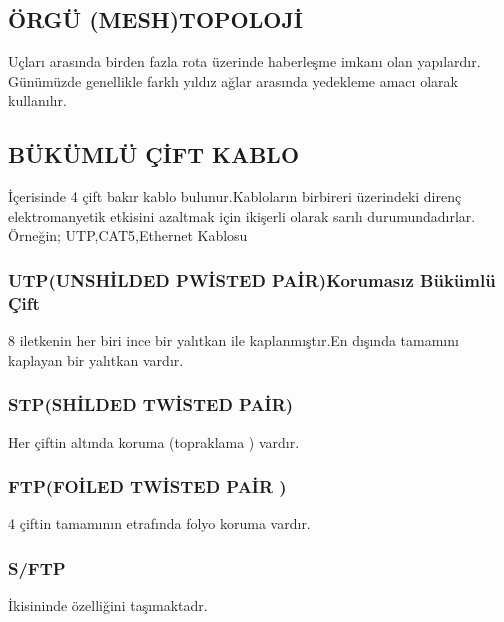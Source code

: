 \subsection*{ÖRGÜ (MESH)TOPOLOJİ}
Uçları arasında birden fazla rota üzerinde haberleşme imkanı olan yapılardır.
Günümüzde genellikle farklı yıldız ağlar arasında yedekleme amacı olarak kullanılır.


\subsection{BÜKÜMLÜ ÇİFT KABLO}
  İçerisinde 4 çift bakır kablo bulunur.Kabloların birbireri üzerindeki direnç elektromanyetik etkisini azaltmak için ikişerli olarak sarılı durumundadırlar.
  Örneğin; UTP,CAT5,Ethernet Kablosu 

\subsubsection{UTP(UNSHİLDED PWİSTED PAİR)Korumasız Bükümlü Çift} 
    8 iletkenin her biri ince bir yalıtkan ile kaplanmıştır.En dışında tamamını kaplayan bir yalıtkan vardır.
\subsubsection{STP(SHİLDED TWİSTED PAİR)} 
Her çiftin altında koruma (topraklama ) vardır.
\subsubsection{FTP(FOİLED TWİSTED PAİR )} 
4 çiftin tamamının etrafında folyo koruma vardır.
\subsubsection {S/FTP }
İkisininde özelliğini taşımaktadr.
    
